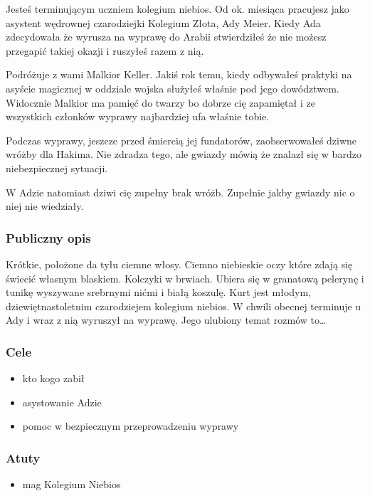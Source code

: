 \documentclass[11pt]{article}
\begin{document}
    Jesteś terminującym uczniem kolegium niebios. Od ok. miesiąca
    pracujesz jako asystent wędrownej czarodziejki Kolegium Złota,
    Ady Meier. Kiedy Ada zdecydowała że wyrusza na wyprawę do Arabii
    stwierdziłeś że nie możesz przegapić takiej okazji i ruszyłeś
    razem z nią.

    Podróżuje z wami Malkior Keller. Jakiś rok temu, kiedy odbywałeś
    praktyki na asyście magicznej w oddziale wojska służyłeś właśnie
    pod jego dowództwem. Widocznie Malkior ma pamięć do twarzy bo
    dobrze cię zapamiętał i ze wszystkich członków wyprawy
    najbardziej ufa właśnie tobie.

    Podczas wyprawy, jeszcze przed śmiercią jej fundatorów,
    zaobserwowałeś dziwne wróżby dla Hakima. Nie zdradza tego, ale
    gwiazdy mówią że znalazł się w bardzo niebezpiecznej sytuacji.

    W Adzie natomiast dziwi cię zupełny brak wróżb. Zupełnie jakby
    gwiazdy nic o niej nie wiedziały.
\subsubsection*{Publiczny opis}
\label{sec-3.4.2}

    Krótkie, położone da tyłu ciemne włosy. Ciemno niebieskie oczy
    które zdają się świecić własnym blaskiem. Kolczyki w
    brwiach. Ubiera się w granatową pelerynę i tunikę wyszywane
    srebrnymi nićmi i białą koszulę.
    Kurt jest młodym, dziewiętnastoletnim czarodziejem kolegium
    niebios. W chwili obecnej terminuje u Ady i wraz z nią wyruszył
    na wyprawę. 
    Jego ulubiony temat rozmów to\ldots{}
\subsubsection*{Cele}
\label{sec-3.4.3}

\begin{itemize}
\item kto kogo zabił
\item asystowanie Adzie
\item pomoc w bezpiecznym przeprowadzeniu wyprawy
\end{itemize}
\subsubsection*{Atuty}
\label{sec-3.4.4}

\begin{itemize}
\item mag Kolegium Niebios
\end{itemize}
\end{document}
